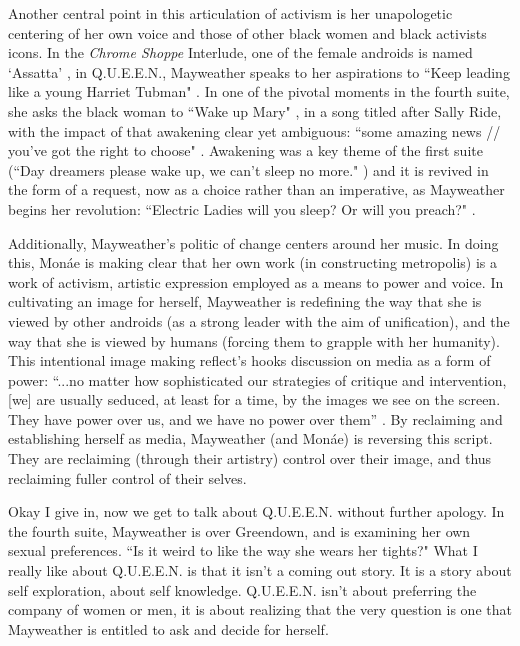 \documentclass[a4paper, 11pt]{article} %
\begin{document}
Another central point in this articulation of activism is her unapologetic centering of her own voice and those of other black women and black activists icons.
In the \emph{Chrome Shoppe} Interlude, one of the female androids is named `Assatta' \cite{chromeshoppe}, in Q.U.E.E.N., Mayweather speaks to her aspirations to ``Keep leading like a young Harriet Tubman" \cite{queen}.
In one of the pivotal moments in the fourth suite, she asks the black woman to ``Wake up Mary" \cite{sallyride}, in a song titled after Sally Ride, with the impact of that awakening clear yet ambiguous: ``some amazing news // you've got the right to choose" \cite{sallyride}. Awakening was a key theme of the first suite (``Day dreamers please wake up, we can't sleep no more." \cite{sincerelyjane}) and it is revived in the form of a request, now as a choice rather than an imperative, as Mayweather begins her revolution: ``Electric Ladies will you sleep? Or will you preach?" \cite{queen}.

Additionally, Mayweather's politic of change centers around her music.
In doing this, Mon\'ae is making clear that her own work (in constructing metropolis) is a work of activism, artistic expression employed as a means to power and voice.
In cultivating an image for herself, Mayweather is redefining the way that she is viewed by other androids (as a strong leader with the aim of unification), and the way that she is viewed by humans (forcing them to grapple with her humanity).
This intentional image making reflect's hooks discussion on media as a form of power: ``...no matter how sophisticated our strategies of critique and intervention, [we] are usually seduced, at least for a time, by the images we see on the screen. They have power over us, and we have no power over them'' \cite{hooksmediatheory}.
By reclaiming and establishing herself as media, Mayweather (and Mon\'ae) is reversing this script.
They are reclaiming (through their artistry) control over their image, and thus reclaiming fuller control of their selves.

Okay I give in, now we get to talk about Q.U.E.E.N. without further apology.
In the fourth suite, Mayweather is over Greendown, and is examining her own sexual preferences.
``Is it weird to like the way she wears her tights?" \cite{queen}
What I really like about Q.U.E.E.N. is that it isn't a coming out story.
It is a story about self exploration, about self knowledge. 
Q.U.E.E.N. isn't about preferring the company of women or men, it is about realizing that the very question is one that Mayweather is entitled to ask and decide for herself.
\end{document}
